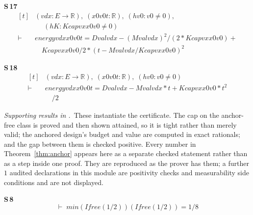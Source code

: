 \noindent\textbf{S\,17}\quad{}
{\footnotesize\[ \begin{aligned}[t]
&(\mathit{v} \mathit{d} \mathit{x} : \mathit{E} \to \mathbb{R} ),\; (\mathit{x0} \mathit{v0} \mathit{t} : \mathbb{R} ),\; (\mathit{hv0} : \mathit{v0} \neq 0),\\
&\quad \; (\mathit{hK} : \mathit{Kcap} \mathit{v} \mathit{x} \mathit{x0} \mathit{v0} \neq 0)\\
\vdash\;&\mathit{energy} \mathit{v} \mathit{d} \mathit{x} \mathit{x0} \mathit{v0} \mathit{t} = \mathit{Dval} \mathit{v} \mathit{d} \mathit{x} - (\mathit{Mval} \mathit{v} \mathit{d} \mathit{x}) ^{2} / (2 * \mathit{Kcap} \mathit{v} \mathit{x} \mathit{x0} \mathit{v0}) +\\
&\quad \mathit{Kcap} \mathit{v} \mathit{x} \mathit{x0} \mathit{v0} / 2 * (\mathit{t} - \mathit{Mval} \mathit{v} \mathit{d} \mathit{x} / \mathit{Kcap} \mathit{v} \mathit{x} \mathit{x0} \mathit{v0}) ^{2}
\end{aligned} \]}

\noindent\textbf{S\,18}\quad{}
{\footnotesize\[ \begin{aligned}[t]
&(\mathit{v} \mathit{d} \mathit{x} : \mathit{E} \to \mathbb{R} ),\; (\mathit{x0} \mathit{v0} \mathit{t} : \mathbb{R} ),\; (\mathit{hv0} : \mathit{v0} \neq 0)\\
\vdash\;&\mathit{energy} \mathit{v} \mathit{d} \mathit{x} \mathit{x0} \mathit{v0} \mathit{t} = \mathit{Dval} \mathit{v} \mathit{d} \mathit{x} - \mathit{Mval} \mathit{v} \mathit{d} \mathit{x} * \mathit{t} + \mathit{Kcap} \mathit{v} \mathit{x} \mathit{x0} \mathit{v0} * \mathit{t} ^{2}\\
&\quad / 2
\end{aligned} \]}


\noindent\emph{Supporting results in .}~These instantiate the certificate. The cap on the anchor-free class is proved and then shown attained, so it is tight rather than merely valid; the anchored design's budget and value are computed in exact rationals; and the gap between them is checked positive. Every number in Theorem~\ref{thm:anchor} appears here as a separate checked statement rather than as a step inside one proof. They are reproduced as the prover has them; a further $1$ audited declarations in this module are positivity checks and measurability side conditions and are not displayed.

\noindent\textbf{S\,8}\quad{}
{\footnotesize\[ \vdash\; \mathit{min} (\mathit{Ifree} (1/2)) (\mathit{Ifree} (1/2)) = 1 / 8 \]}

